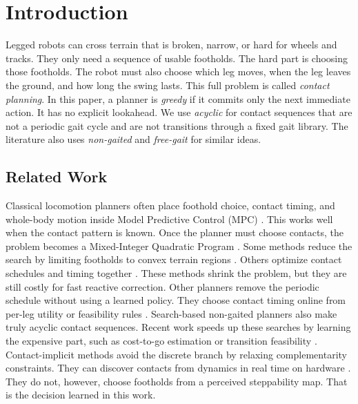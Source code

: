 \section{Introduction}
\label{sec:introduction}

Legged robots can cross terrain that is broken, narrow, or hard for
wheels and tracks. They only need a sequence of usable footholds. The
hard part is choosing those footholds. The robot must also choose
which leg moves, when the leg leaves the ground, and how long the
swing lasts. This full problem is called \textit{contact planning}.
In this paper, a planner is \textit{greedy} if it commits only the
next immediate action. It has no explicit lookahead. We use
\textit{acyclic} for contact sequences that are not a periodic gait
cycle and are not transitions through a fixed gait library. The
literature also uses \textit{non-gaited} and \textit{free-gait} for
similar ideas.

\subsection{Related Work}

Classical locomotion planners often place foothold choice, contact
timing, and whole-body motion inside Model Predictive Control (MPC)
\cite{Kim2019highly-dynamic, Wensing2022Nov}. This works well when
the contact pattern is known. Once the planner must choose contacts,
the problem becomes a Mixed-Integer Quadratic Program
\cite{Geisert2019contact-planning}. Some methods reduce the search by
limiting footholds to convex terrain regions
\cite{deits_footstep_2014}. Others optimize contact schedules and
timing together \cite{winkler_gait_2018,
aceituno_simultaneous_2019}. These methods shrink the problem, but
they are still costly for fast reactive correction.
Other planners remove the periodic schedule without using a
learned policy. They choose contact timing online from per-leg utility
or feasibility rules
\cite{fankhauser_free_gait_2016, boussema_online_2019,
bjelonic_whole-body_2021}. Search-based non-gaited planners
\cite{amatucci_monte_2022} also make truly acyclic contact sequences.
Recent work speeds up these searches by learning the expensive part,
such as cost-to-go estimation \cite{taouil_non-gaited_2024} or
transition feasibility \cite{akizhanov_learning_2024}.
Contact-implicit methods avoid the discrete branch by relaxing
complementarity constraints. They can discover contacts from dynamics
in real time on hardware \cite{kim_contact-implicit_2025}. They do
not, however, choose footholds from a perceived steppability map. That
is the decision learned in this work.

